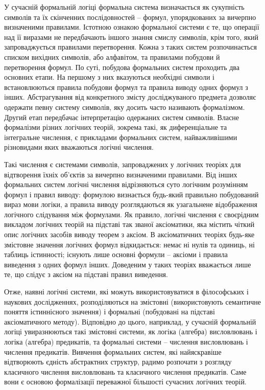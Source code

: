 У сучасній формальній логіці формальна система визначається як
сукупність символів та їх скінченних послідовностей – формул, упорядкованих
за вичерпно визначеними правилами. Істотною ознакою формальної системи є
те, що операції над її виразами не передбачають іншого знання смислу
символів, крім того, який запроваджується правилами перетворення. Кожна з
таких систем розпочинається списком вихідних символів, або алфавітом, та
правилами побудови й перетворення формул. По суті, побудова формальних
систем проходить два основних етапи. На першому з них вказуються необхідні
символи і встановлюються правила побудови формул та правила виводу одних
формул з інших. Абстрагування від конкретного змісту досліджуваного
предмета дозволяє одержати певну систему символів, яку досить часто
називають формалізмом. Другий етап передбачає інтерпретацію одержаних
систем символів. Власне формалізми різних логічних теорій, зокрема такі, як
диференціальне та інтегральне числення, є прикладами формальних систем,
найважливішими різновидами яких вважаються логічні числення.

Такі числення є системами символів, запроваджених у логічних теоріях для
відтворення їхніх об’єктів за вичерпно визначеними правилами. Від інших
формальних систем логічні числення відрізняються суто логічним розумінням
формул і правил виводу: формулою визнається будь-який правильно
побудований вираз мови логіки, а правила виводу розглядаються як
узагальнене відображення логічного слідування між формулами. Як правило,
логічні числення є своєрідним викладом логічних теорій на підставі так званої
аксіоматики, яка містить чіткий опис логічних засобів виводу теорем з аксіом.
В аксіоматичних теоріях будь-яке змістовне значення логічних формул
відкидається: немає ні нулів та одиниць, ні таблиць істинності; існують лише
основні формули – аксіоми і правила виведення з одних формул інших.
Доведеним у таких теоріях вважається лише те, що слідує з аксіом на підставі
правил виведення.

Отже, наявні логічні системи, які можуть використовуватися в
філософських і наукових дослідженнях, розподіляються на змістовні
(використовують семантичне поняття істиннісного значення) і формальні
(побудовані на підставі аксіоматичного методу). Відповідно до цього,
наприклад, у сучасній формальній логіці увиразнюються такі змістовні
системи, як логіка (алгебра) висловлювань і логіка (алгебра) предикатів, та
формальні системи – числення висловлювань і числення предикатів. Вивчення
формальних систем, які найяскравіше відтворюють єдність абстрактних
структур, радимо розпочати з розгляду класичного числення висловлювань та
класичного числення предикатів. Саме вони є основою формалізації переважної
більшості сучасних логічних теорій.

